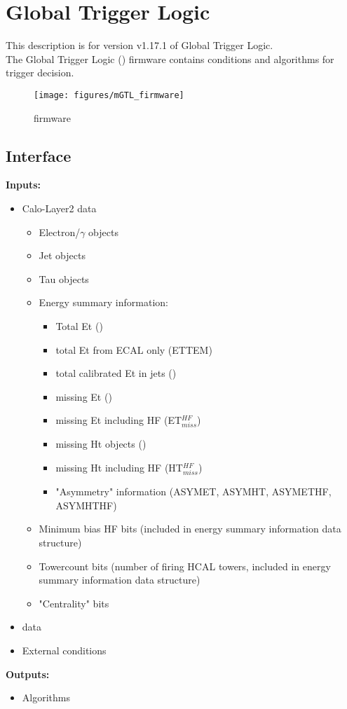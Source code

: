 \section{Global Trigger Logic}
\label{sec:gtl:global_trigger_logic}

This description is for version v1.17.1 of Global Trigger Logic.\\

The Global Trigger Logic (\ugtl) firmware contains conditions and algorithms for trigger decision.


\begin{figure}[htb]
\centering
\texttt{[image: figures/mGTL\_firmware]}
\caption{\ugtl firmware}
\label{fig:gtl:mGTL_firmware}
\end{figure}

\subsection{\ugtl Interface}
\label{sec:gtl:ugtl_interface}



\textbf{Inputs:}
\begin{itemize}
\item Calo-Layer2 data
\begin{itemize}
\item Electron/$\gamma$ objects
\item Jet objects
\item Tau objects
\item Energy summary information:
\begin{itemize}
\item Total Et (\ett)
\item total Et from ECAL only (ETTEM)
\item total calibrated Et in jets (\htt)
\item missing Et (\etm)
\item missing Et including HF (ET$_{miss}^{HF}$)
\item missing Ht objects (\htm)
\item missing Ht including HF (HT$_{miss}^{HF}$)
\item "Asymmetry" information (ASYMET, ASYMHT, ASYMETHF, ASYMHTHF)
\end{itemize}
\item Minimum bias HF bits (included in energy summary information data structure)
\item Towercount bits (number of firing HCAL towers, included in energy summary information data structure)
\item "Centrality" bits
\end{itemize}
\item \gmt data
\item External conditions
\end{itemize}
\textbf{Outputs:}
\begin{itemize}
\item Algorithms
\end{itemize}

